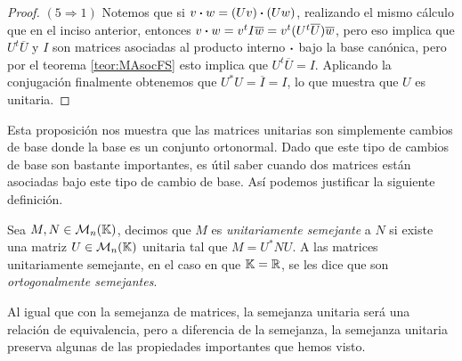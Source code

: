 \begin{proof}
  \medskip\noindent
  $(5 \Rightarrow 1)$ Notemos que si $v\boldsymbol\cdot w  = (Uv) \boldsymbol\cdot (Uw)$, realizando el mismo cálculo que en el inciso anterior, entonces $v\boldsymbol\cdot w = v^t I \overline{w} = v^t (U^t \overline{U}) \overline{w}$, pero eso implica que $U^t \overline{U}$ y $I$ son matrices asociadas al producto interno $\boldsymbol\cdot$ bajo la base canónica, pero por el teorema \ref{teor:MAsocFS} esto implica que $U^t \overline{U} = I$. Aplicando la conjugación finalmente obtenemos que $U^* U = \overline{I} = I$, lo que muestra que $U$ es unitaria.
\end{proof}

Esta proposición nos muestra que las matrices unitarias son simplemente cambios de base donde la base es un conjunto ortonormal. Dado que este tipo de cambios de base son bastante importantes, es útil saber cuando dos matrices están asociadas bajo este tipo de cambio de base. Así podemos justificar la siguiente definición.

\begin{defi}
  Sea $M,N \in \mathcal{M}_n(\mathbb{K})$, decimos que $M$ es \emph{unitariamente semejante} a $N$ si existe una matriz $U\in \mathcal{M}_n(\mathbb{K})$ unitaria tal que $M = U^* N U$. A las matrices unitariamente semejante, en el caso en que $\mathbb{K} = \mathbb{R}$, se les dice que son \emph{ortogonalmente semejantes}.
\end{defi}

Al igual que con la semejanza de matrices, la semejanza unitaria será una relación de equivalencia, pero a diferencia de la semejanza, la semejanza unitaria preserva algunas de las propiedades importantes que hemos visto.

